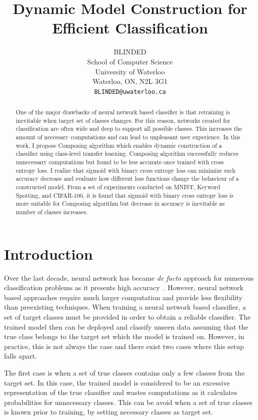 \documentclass{article}
\title{Dynamic Model Construction for Efficient Classification}
\author{
    BLINDED \\
    School of Computer Science\\
    University of Waterloo\\
    Waterloo, ON, N2L 3G1 \\
    \texttt{BLINDED@uwaterloo.ca} \\
}
\begin{document}
\maketitle

\begin{abstract}

One of the major drawbacks of neural network based classifier is that retraining is inevitable when target set of classes changes. For this reason, networks created for classification are often wide and deep to support all possible classes. This increases the amount of necessary computations and can lead to unpleasant user experience. In this work, I propose Composing algorithm which enables dynamic construction of a classifier using class-level transfer learning. Composing algorithm successfully reduces unnecessary computations but found to be less accurate once trained with cross entropy loss. I realize that sigmoid with binary cross entropy loss can minimize such accuracy decrease and evaluate how different loss functions change the behaviour of a constructed model. From a set of experiments conducted on MNIST, Keyword Spotting, and CIFAR-100, it is found that sigmoid with binary cross entropy loss is more suitable for Composing algorithm but decrease in accuracy is inevitable as number of classes increases.

\end{abstract}

\section{Introduction}

Over the last decade, neural network has became {\it de facto} approach for numerous classification problems as it presents high accuracy~\cite{lecun1998gradient, chen2014small, krizhevsky2009learning}. However, neural network based approaches require much larger computation and provide less flexibility than preexisting techniques. When training a neural network based classifier, a set of target classes must be provided in order to obtain a reliable classifier. The trained model then can be deployed and classify unseen data assuming that the true class belongs to the target set which the model is trained on. However, in practice, this is not always the case and there exist two cases where this setup falls apart.

The first case is when a set of true classes contains only a few classes from the target set. In this case, the trained model is considered to be an excessive representation of the true classifier and wastes computations as it calculates probabilities for unnecessary classes. This can be avoid when a set of true classes is known prior to training, by setting necessary classes as target set.
\end{document}
